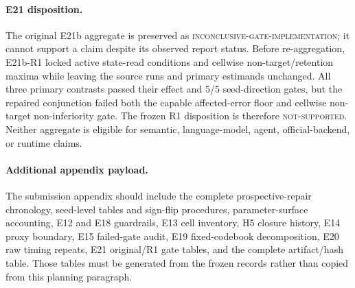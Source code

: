 \paragraph{E21 disposition.}
The original E21b aggregate is preserved as
\textsc{inconclusive-gate-implementation}; it cannot support a claim despite
its observed report status.  Before re-aggregation, E21b-R1 locked active
state-read conditions and cellwise non-target/retention maxima while leaving
the source runs and primary estimands unchanged.  All three primary contrasts
passed their effect and 5/5 seed-direction gates, but the repaired conjunction
failed both the capable affected-error floor and cellwise non-target
non-inferiority gate.  The frozen R1 disposition is therefore
\textsc{not-supported}.  Neither aggregate is eligible for semantic,
language-model, agent, official-backend, or runtime claims.

\paragraph{Additional appendix payload.}
The submission appendix should include the complete prospective-repair
chronology, seed-level tables and sign-flip procedures, parameter-surface
accounting, E12 and E18 guardrails, E13 cell inventory, H5 closure history,
E14 proxy boundary, E15 failed-gate audit, E19 fixed-codebook decomposition,
E20 raw timing repeats, E21 original/R1 gate tables, and the complete
artifact/hash table.  Those tables must be generated from the frozen records
rather than copied from this planning paragraph.
